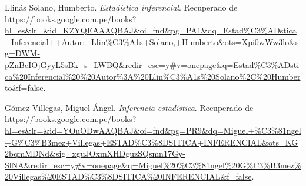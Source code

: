 \begin{thebibliography}{9}
  Llinás Solano, Humberto. \textit{Estadística inferencial}. Recuperado de \url{https://books.google.com.pe/books?hl=es&lr=&id=KZYQEAAAQBAJ&oi=fnd&pg=PA1&dq=Estad%C3%ADstica+Inferencial++Autor:+Llin%C3%A1s+Solano,+Humberto&ots=Xpi0wWw3lo&sig=DWM-pZnBeIOjGyyL5sBk_s_LWBQ&redir_esc=y#v=onepage&q=Estad%C3%ADstica%20Inferencial%20%20Autor%3A%20Llin%C3%A1s%20Solano%2C%20Humberto&f=false}.

  Gómez Villegas, Miguel Ángel. \textit{Inferencia estadística}. Recuperado de \url{https://books.google.com.pe/books?hl=es&lr=&id=YOuODwAAQBAJ&oi=fnd&pg=PR9&dq=Miguel+%C3%81ngel+G%C3%B3mez+Villegas+ESTAD%C3%8DSITICA+INFERENCIAL&ots=KG2bqmMDNd&sig=xguJOxmXHDguzSQsmn17Gy-SlNA&redir_esc=y#v=onepage&q=Miguel%20%C3%81ngel%20G%C3%B3mez%20Villegas%20ESTAD%C3%8DSITICA%20INFERENCIAL&f=false}.


\end{thebibliography}